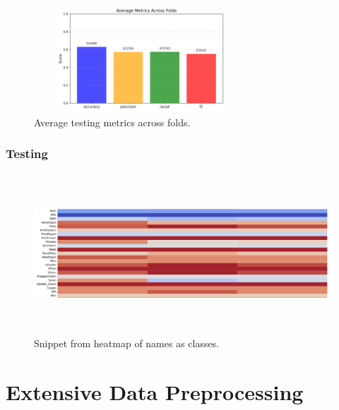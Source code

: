 \documentclass[10pt,english,a4paper]{report}
\begin{document}
\begin{figure}[h!]
    \centering
    \includegraphics[width=8cm, height=4cm]{figures/testing/agg_average_metrics_plot.png} 
    \caption{Average testing metrics across folds.}
    \label{fig:average_testing_metrics}
\end{figure}


\subsubsection{Testing}

\begin{figure}[h!]
    \centering
    \includegraphics[width=16cm, height=6cm]{figures/heatmap_snippet.png} 
    \caption{Snippet from heatmap of names as classes.}
    \label{fig:func_lengths_distr_merged}
\end{figure}



\section{Extensive Data Preprocessing}






\end{document}
